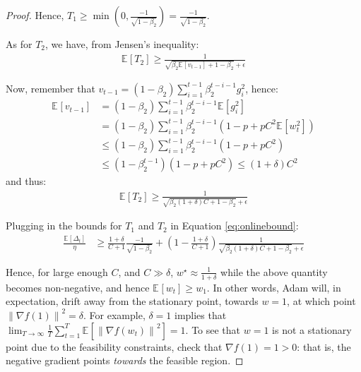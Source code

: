 \documentclass{article}
\newcommand{\currw}{w_t}
\newcommand{\w}{w}
\newcommand{\prevv}{v_{t-1}}
\newcommand{\normed}[1]{\left\lVert {#1} \right\rVert}
\newcommand{\btwo}{\beta_2}
\newcommand{\expec}[2]{\mathbb E_{#1} \left[ {#2} \right]}
\begin{document}
\begin{proof}
Hence,
$T_1 \geq \min(0, \frac{- 1 }{\sqrt{1-\btwo}}) = \frac{- 1 }{\sqrt{1-\btwo}}$.

As for $T_2$, we have, from Jensen's inequality:
\begin{equation}
\begin{split}
   \expec{}{T_2} \geq
      \frac{1}{\sqrt{\btwo \expec{}{\prevv} + 1-\btwo} + \epsilon}
\end{split}
\end{equation}

Now, remember that $\prevv = (1-\btwo) \sum_{i=1}^{t-1} \btwo^{t-i-1} g_i^2$,
hence:
\begin{equation}
\begin{split}
   \expec{}{\prevv}
   &= (1-\btwo) \sum_{i=1}^{t-1} \btwo^{t-i-1} \expec{}{g_i^2} \\
   &= (1-\btwo) \sum_{i=1}^{t-1} \btwo^{t-i-1} \left(1 -p + p C^2 \expec{}{\currw^2} \right) \\
   &\leq (1-\btwo) \sum_{i=1}^{t-1} \btwo^{t-i-1} \left(1 -p + p C^2 \right) \\
   &\leq (1-\btwo^{t-1}) \left(1 -p + p C^2 \right) \leq (1+\delta) C^2
\end{split}
\end{equation}
and thus:
\begin{equation}
\begin{split}
   \expec{}{T_2} \geq \frac{1}{\sqrt{\btwo (1+\delta) C + 1-\btwo} + \epsilon}
\end{split}
\end{equation}

Plugging in the bounds for $T_1$ and $T_2$ in Equation \ref{eq:onlinebound}:
\begin{equation}
\begin{split}
   \frac{\expec{}{\Delta_t}}{\eta}
   &\geq
      \frac{1+\delta}{C+1} \frac{- 1 }{\sqrt{1-\btwo}} +
      \left(1-\frac{1+\delta}{C+1}\right)
      \frac{1}{\sqrt{\btwo (1+\delta) C + 1-\btwo} + \epsilon}
\end{split}
\end{equation}

Hence, for large enough $C$, and $C \gg \delta$,
$\w^\star \approx \frac{1}{1+\delta}$ while the above quantity becomes
non-negative, and hence $\expec{}{\currw} \geq \w_1$.  In other words, Adam
will, in expectation, drift away from the stationary point, towards $\w = 1$,
at which point $\normed{\nabla f(1)}^2 = \delta$.  For example, $\delta=1$
implies that
$\lim_{T \to \infty}
   \frac1T \sum_{t=1}^T \expec{}{\normed{\nabla f(\currw)}^2} = 1$. To see that $w=1$ is not a stationary point due to the feasibility constraints, check that $\nabla f(1) = 1 > 0$: that is, the negative gradient points \textit{towards} the feasible region.
\end{proof}
\end{document}
